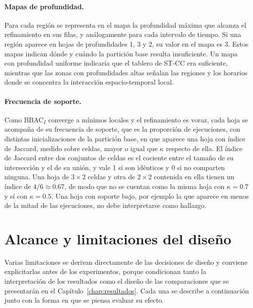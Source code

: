 \paragraph{Mapas de profundidad.} Para cada región se representa en el mapa la
profundidad máxima que alcanza el refinamiento en sus filas, y análogamente para
cada intervalo de tiempo. Si una región aparece en hojas de profundidades 1, 3 y 2,
su valor en el mapa es 3. Estos mapas indican dónde y cuándo la partición base
resulta insuficiente. Un mapa con profundidad uniforme indicaría que el tablero de
ST-CC era suficiente, mientras que las zonas con profundidades altas señalan las
regiones y los horarios donde se concentra la interacción espacio-temporal local.

\paragraph{Frecuencia de soporte.} Como BBAC$_I$ converge a mínimos locales y
el refinamiento es voraz, cada hoja se acompaña de su frecuencia de soporte,
que es la proporción de ejecuciones, con distintas inicializaciones de la partición
base, en que aparece una hoja con índice de Jaccard, medido sobre celdas,
mayor o igual que $\kappa$ respecto de ella. El índice de Jaccard entre dos
conjuntos de celdas es el cociente entre el tamaño de su intersección y el de su
unión, y vale 1 si son idénticos y 0 si no comparten ninguna. Una hoja de $3\times2$
celdas y otra de $2\times2$ contenida en ella tienen un índice de $4/6\approx0.67$,
de modo que no se cuentan como la misma hoja con $\kappa=0.7$ y sí con
$\kappa=0.5$. Una hoja con soporte bajo, por ejemplo la que aparece en menos de la
mitad de las ejecuciones, no debe interpretarse como hallazgo.

\section{Alcance y limitaciones del diseño}\label{sec:prop-limitaciones}

Varias limitaciones se derivan directamente de las decisiones de diseño y
conviene explicitarlas antes de los experimentos, porque condicionan tanto la
interpretación de los resultados como el diseño de las comparaciones que se
presentarán en el Capítulo~\ref{chap:resultados}. Cada una se describe a
continuación junto con la forma en que se piensa evaluar su efecto.

